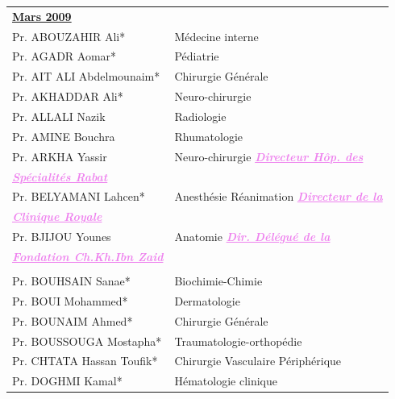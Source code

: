   \begin{table}[H]

    \begin{tabular}{l l}
     \multicolumn{2}{l}{\textbf{\underline{Mars 2009}}}\vspace*{0.5em}\\

     Pr. ABOUZAHIR Ali* & \hspace*{2em} Médecine interne\\
     Pr. AGADR Aomar*	 & \hspace*{2em} Pédiatrie \\
     Pr. AIT ALI Abdelmounaim* & \hspace*{2em} Chirurgie Générale\\
     Pr. AKHADDAR Ali* & \hspace*{2em} Neuro-chirurgie \\
     Pr. ALLALI Nazik & \hspace*{2em} Radiologie\\
     Pr. AMINE Bouchra & \hspace*{2em} Rhumatologie\\   
     Pr. ARKHA Yassir & \hspace*{2em} Neuro-chirurgie  \textcolor{violet}{\textbf{\emph{\underline{Directeur Hôp. des}}}} \\
     \textcolor{violet}{\textbf{\emph{\underline{Spécialités Rabat }}}} & \\
     Pr. BELYAMANI Lahcen* & \hspace*{2em} Anesthésie Réanimation \textcolor{violet}{\textbf{\emph{\underline{Directeur de la}}}} \\
     \textcolor{violet}{\textbf{\emph{\underline{Clinique Royale}}}} & \\   
     Pr. BJIJOU Younes & \hspace*{2em} Anatomie \textcolor{violet}{\textbf{\emph{\underline{Dir. Délégué de la }}}}\\
     \textcolor{violet}{\textbf{\emph{\underline{Fondation Ch.Kh.Ibn Zaid}}}}\\ & \\
     Pr. BOUHSAIN Sanae* & \hspace*{2em} Biochimie-Chimie\\   
     Pr. BOUI Mohammed* & \hspace*{2em} Dermatologie\\
     Pr. BOUNAIM Ahmed* & \hspace*{2em} Chirurgie Générale\\   
     Pr. BOUSSOUGA Mostapha* & \hspace*{2em} Traumatologie-orthopédie\\
     Pr. CHTATA Hassan Toufik* & \hspace*{2em} Chirurgie Vasculaire Périphérique\\
     Pr. DOGHMI Kamal* & \hspace*{2em} Hématologie clinique\\   
    
    \end{tabular}
    
  \end{table}

